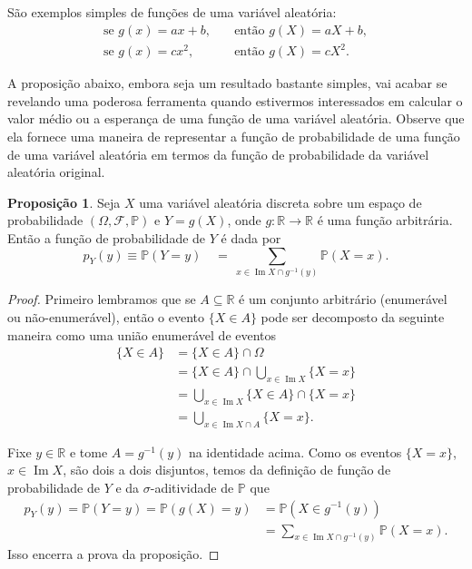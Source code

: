 \documentclass[12pt,portuguese]{article}
\theoremstyle{definition}
\newtheorem{proposition}[proposition]{Proposição}
\begin{document}
São exemplos simples de funções de uma variável aleatória:
\[
\begin{aligned}
\text{se } g(x) = ax + b, &\quad \text{então } g(X) = aX + b,\\[0.3cm]
\text{se } g(x) = cx^2,  &\quad \text{então } g(X) = cX^2.
\end{aligned}
\]

A proposição abaixo, embora seja um resultado bastante simples, vai acabar se revelando uma poderosa
ferramenta quando estivermos interessados em calcular o valor médio ou a esperança de uma função de uma
variável aleatória. Observe que ela fornece uma maneira de representar a função de probabilidade 
de uma função de uma variável aleatória em termos da função de probabilidade da variável aleatória original.

\begin{proposition}
Seja $X$ uma variável aleatória discreta sobre um espaço de probabilidade $(\Omega,\mathcal{F},\mathbb{P})$ e
\(Y = g(X)\), onde $g:\mathbb{R}\to\mathbb{R}$ é uma função arbitrária. Então 
a função de probabilidade de \(Y\) é dada por
\begin{equation}\label{eq:funcao-massa-g}
p_Y(y) \equiv \mathbb{P}(Y=y) \quad =\  \sum_{x \in \operatorname{Im} X \cap g^{-1}(y)} \mathbb{P}(X = x).
\end{equation}
\end{proposition}

\begin{proof}
Primeiro lembramos que se $A\subseteq \mathbb{R}$ é um conjunto arbitrário (enumerável ou não-enumerável), 
então o evento $\{X\in A\}$ pode ser decomposto da seguinte maneira como uma união enumerável de eventos
\begin{align*}
\{X\in A\} &= \{X\in A\} \cap \Omega 
\\[0.3cm]
&= \{X\in A\} \cap \bigcup_{x\in \operatorname{Im} X} \{X=x\}
\\[0.3cm]
&=
\bigcup_{x\in \operatorname{Im} X} \{X\in A\} \cap  \{X=x\}
\\[0.3cm]
&= \bigcup_{x\in \operatorname{Im} X\cap A} \{X=x\}.
\end{align*}

Fixe $y\in \mathbb{R}$ e tome $A=g^{-1}(y)$ na identidade acima. Como os eventos
$\{X=x\}$, $x\in \operatorname{Im} X$, são dois a dois disjuntos, temos da definição
de função de probabilidade de $Y$ e da $\sigma$-aditividade de $\mathbb{P}$ que
\begin{equation*}
\begin{aligned}
p_Y(y) = \mathbb{P}(Y = y) 
= \mathbb{P}(g(X) = y)
&= \mathbb{P}(X \in g^{-1}(y)) \\[0.3cm]
&= \sum_{x\in \operatorname{Im} X\cap g^{-1}(y)} \mathbb{P}(X = x).
\end{aligned}
\end{equation*}
Isso encerra a prova da proposição.
\end{proof}
\end{document}
